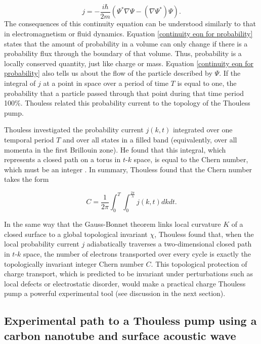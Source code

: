 \documentclass{beavtex_dub_edit}
\begin{document}
\begin{equation}
    j = -\frac{i \hbar}{2 m}\left(\Psi^* \nabla \Psi - (\nabla \Psi^*)\Psi\right). 
\end{equation}
The consequences of this continuity equation can be understood similarly to that in electromagnetism or fluid dynamics. Equation \ref{continuity eqn for probability} states that the amount of probability in a volume can only change if there is a probability flux through the boundary of that volume. Thus, probability is a locally conserved quantity, just like charge or mass. Equation \ref{continuity eqn for probability} also tells us about the flow of the particle described by $\Psi$. If the integral of $j$ at a point in space over a period of time $T$ is equal to one, the probability that a particle passed through that point during that time period 100\%. Thouless related this probability current to the topology of the Thouless pump.

Thouless investigated the probability current $j(k,t)$ integrated over one temporal period $T$ and over all states in a filled band (equivalently, over all momenta in the first Brillouin zone). He found that this integral, which represents a closed path on a torus in $t \textrm{-} k$ space, is equal to the Chern number, which must be an integer \cite{thouless_quantization_1983}. In summary, Thouless found that the Chern number takes the form

\begin{equation}
    C = \frac{1}{2\pi} \int_{0}^{T} \int_{0}^{\frac{2\pi}{\lambda}} j(k,t) dkdt. \label{Thouless Chern equation}
\end{equation}

In the same way that the Gauss-Bonnet theorem links local curvature $K$ of a closed surface to a global topological invariant $\chi$, Thouless found that, when the local probability current $j$ adiabatically traverses a two-dimensional closed path in $t\textrm{-}k$ space, the number of electrons transported over every cycle is exactly the topologically invariant integer Chern number $C$. This topological protection of charge transport, which is predicted to be invariant under perturbations such as local defects or electrostatic disorder, would make a practical charge Thouless pump a powerful experimental tool (see discussion in the next section).

\subsection{Experimental path to a Thouless pump using a carbon nanotube and surface acoustic wave} 
\end{document}
